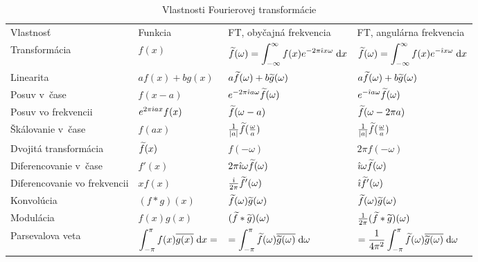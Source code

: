\begin{sidewaystable}[htp]
    \centering
    \renewcommand{\arraystretch}{1.5}
    \begin{tabular}{llll}
    Vlastnosť&Funkcia&FT, obyčajná frekvencia&FT, angulárna
    frekvencia\\
    Transformácia&$f(x)$&
        $\displaystyle \widetilde{f}(\omega) = \int_{-\infty}^{\infty} f(x) e^{-2\pi\hat{\imath} x\omega} \; \mathrm{d} x$&
        $\displaystyle \widetilde{f}(\omega) = \int_{-\infty}^{\infty} f(x) e^{-\hat{\imath} x \omega} \; \mathrm{d} x$\\
    Linearita&$a f(x) + b g(x)$&
        $a \widetilde{f}(\omega) + b \widetilde{g}(\omega)$&
        $a \widetilde{f}(\omega) + b \widetilde{g}(\omega)$\\
    Posuv v~čase&$f(x-a)$&
        $e^{-2\pi\hat{\imath} a \omega} \widetilde{f}(\omega)$&
        $e^{-\hat{\imath} a \omega} \widetilde{f}(\omega)$\\
    Posuv vo frekvencii&$ e^{2\pi\hat{\imath} a x} f(x)$&
        $\widetilde{f}(\omega-a)$&
        $\widetilde{f}(\omega-2\pi a)$\\
    Škálovanie v~čase&$ f(a x)$&
        $\frac{1}{|a|}\widetilde{f}(\frac{\omega}{a})$&
        $\frac{1}{|a|}\widetilde{f}(\frac{\omega}{a})$\\
    Dvojitá transformácia&$ \widetilde{f}(x)$&
        $f(-\omega)$&
        $2\pi f(-\omega)$\\
    Diferencovanie v~čase&$ f'(x)$&
        $2\pi\hat{\imath}\omega \widetilde{f}(\omega)$&
        $\hat{\imath}\omega \widetilde{f}(\omega)$\\
    Diferencovanie vo frekvencii&$x f(x)$&
        $\frac{\hat{\imath}}{2\pi} \widetilde{f}'(\omega)$&
        $\hat{\imath} \widetilde{f}'(\omega)$\\
    Konvolúcia&$ (f*g)(x)$&
        $\widetilde{f}(\omega) \widetilde{g}(\omega)$&
        $\widetilde{f}(\omega) \widetilde{g}(\omega)$\\
    Modulácia&$ f(x)g(x)$&
        $(\widetilde{f}*\widetilde{g})(\omega)$&
        $\frac{1}{2\pi}(\widetilde{f}*\widetilde{g})(\omega)$\\
    Parsevalova veta&
      $\displaystyle \int_{-\pi}^{\pi} f(x)\overline{g(x)} \; \mathrm{d} x=$&
      $\displaystyle =\int_{-\pi}^{\pi} \widetilde{f}(\omega) \overline{\widetilde{g}(\omega)} \; \mathrm{d}\omega$&
      $\displaystyle =\frac{1}{4\pi^2}\int_{-\pi}^{\pi} \widetilde{f}(\omega) \overline{\widetilde{g}(\omega)}
      \; \mathrm{d}\omega$\\
    \end{tabular}
    \caption{Vlastnosti Fourierovej transformácie}
    \label{tab:fourier_transform_vlastnosti}
    \renewcommand{\arraystretch}{1.0}
\end{sidewaystable}

